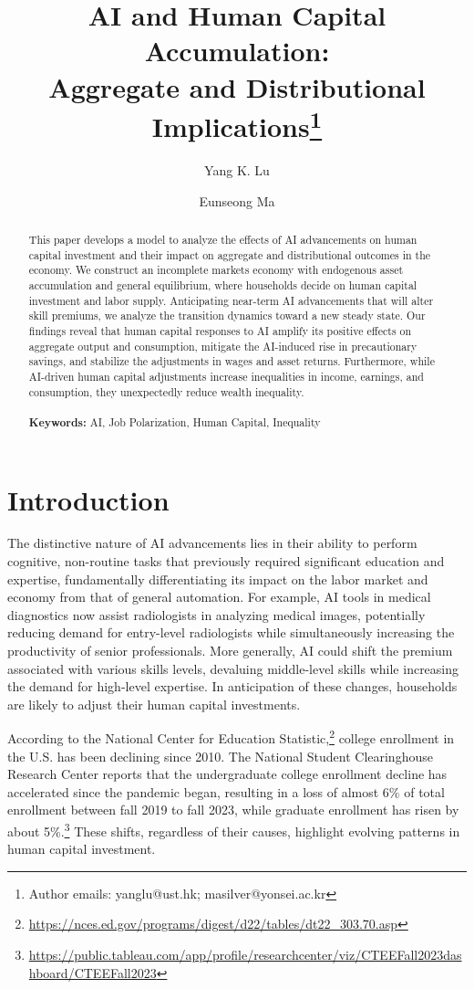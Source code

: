 \documentclass[12pt]{article}
\author[1]{Yang K. Lu}
\author[2]{Eunseong Ma}
\affil[1]{HKUST}
\affil[2]{Yonsei}
\title{\LARGE AI and Human Capital Accumulation: \\ Aggregate and Distributional Implications\footnote{Author emails: yanglu@ust.hk; masilver@yonsei.ac.kr}}
\begin{document}
\maketitle


\begin{abstract}
This paper develops a model to analyze the effects of AI advancements on human capital investment and their impact on aggregate and distributional outcomes in the economy. We construct an incomplete markets economy with endogenous asset accumulation and general equilibrium, where households decide on human capital investment and labor supply. Anticipating near-term AI advancements that will alter skill premiums, we analyze the transition dynamics toward a new steady state. Our findings reveal that human capital responses to AI amplify its positive effects on aggregate output and consumption, mitigate the AI-induced rise in precautionary savings, and stabilize the adjustments in wages and asset returns. Furthermore, while AI-driven human capital adjustments increase inequalities in income, earnings, and consumption, they unexpectedly reduce wealth inequality.\\
\\
\textbf{Keywords:} AI, Job Polarization, Human Capital, Inequality
\end{abstract}
\linenumbers

\newpage

\section{Introduction}
\label{sec:introduction}

The distinctive nature of AI advancements lies in their ability to perform cognitive, non-routine tasks that previously required significant education and expertise, fundamentally differentiating its impact on the labor market and economy from that of general automation. For example, AI tools in medical diagnostics now assist radiologists in analyzing medical images, potentially reducing demand for entry-level radiologists while simultaneously increasing the productivity of senior professionals. More generally, AI could shift the premium associated with various skills levels, devaluing middle-level skills while increasing the demand for high-level expertise. In anticipation of these changes, households are likely to adjust their human capital investments.


According to the National Center for Education Statistic,\footnote{\url{https://nces.ed.gov/programs/digest/d22/tables/dt22_303.70.asp}} college enrollment in the U.S. has been declining since 2010. The National Student Clearinghouse Research Center reports that the undergraduate college enrollment decline has accelerated since the pandemic began, resulting in a loss of almost 6\% of total enrollment between fall 2019 to fall 2023, while graduate enrollment has risen by about 5\%.\footnote{\url{https://public.tableau.com/app/profile/researchcenter/viz/CTEEFall2023dashboard/CTEEFall2023}} These shifts, regardless of their causes, highlight evolving patterns in human capital investment. 
\end{document}

